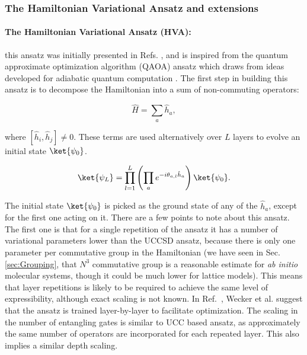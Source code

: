 \subsubsection{The Hamiltonian Variational Ansatz and extensions} \label{sec:hva}

\paragraph{The Hamiltonian Variational Ansatz (HVA):} this ansatz was initially presented in Refs. \cite{Wecker2015, Wiersema2020}, and is inspired from the quantum approximate optimization algorithm (QAOA) ansatz \cite{Farhi2014} which draws from ideas developed for adiabatic quantum computation \cite{Farhi2000}. The first step in building this ansatz is to decompose the Hamiltonian into a sum of non-commuting operators:

\begin{equation}
    \hat{H} = \sum_a \hat{h}_a,
\end{equation}

where $[\hat{h}_i, \hat{h}_j] \neq 0$. These terms are used alternatively over $L$ layers to evolve an initial state $\ket{\psi_0}$.

\begin{equation}
    \ket{\psi_L} = \prod_{l=1}^L \left( \prod_a e^{-i \theta_{a, l} \hat{h}_a} \right) \ket{\psi_0}.
\end{equation}

The initial state $\ket{\psi_0}$ is picked as the ground state of any of the $\hat{h}_a$, except for the first one acting on it. There are a few points to note about this ansatz. The first one is that for a single repetition of the ansatz it has a number of variational parameters lower than the UCCSD ansatz, because there is only one parameter per commutative group in the Hamiltonian (we have seen in Sec. \ref{sec:Grouping}, that $N^3$ commutative group is a reasonable estimate for \textit{ab initio} molecular systems, though it could be much lower for lattice models). This means that layer repetitions is likely to be required to achieve the same level of expressibility, although exact scaling is not known. In Ref.~\cite{Wecker2015}, Wecker et al. suggest that the ansatz is trained layer-by-layer to facilitate optimization. The scaling in the number of entangling gates is similar to UCC based ansatz, as approximately the same number of operators are incorporated for each repeated layer. This also implies a similar depth scaling.

